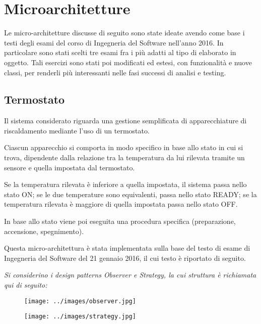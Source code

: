\section{Microarchitetture}

Le micro-architetture discusse di seguito sono state ideate avendo come base i testi degli esami del corso di Ingegneria del Software nell'anno 2016. In particolare sono stati scelti tre esami fra i più adatti al tipo di elaborato in oggetto.
Tali esercizi sono stati poi modificati ed estesi, con funzionalità e nuove classi, per renderli più interessanti nelle fasi successi di analisi e testing.

\subsection{Termostato}

Il sistema considerato riguarda una gestione semplificata di apparecchiature di riscaldamento mediante l’uso di un termostato. 

Ciascun apparecchio si comporta in modo specifico in base allo stato in cui si trova, dipendente dalla relazione tra la temperatura da lui rilevata tramite un sensore e quella impostata dal termostato. 

Se la temperatura rilevata è inferiore a quella impostata, il sistema passa nello stato ON; se le due temperature sono equivalenti, passa nello stato READY; se la temperatura rilevata è maggiore di quella impostata passa nello stato OFF. 

In base allo stato viene poi eseguita una procedura specifica (preparazione, accensione, spegnimento).

Questa micro-architettura è stata implementata sulla base del testo di esame di Ingegneria del Software del 21 gennaio 2016, il cui testo è riportato di seguito.

\vspace{0.5cm}

\emph{Si considerino i design patterns Observer e Strategy, la cui struttura è richiamata qui di seguito:
}
\begin{figure}[h]
    \texttt{[image: ../images/observer.jpg]}
\end{figure}

\begin{figure}[h]
    \texttt{[image: ../images/strategy.jpg]}
\end{figure}


